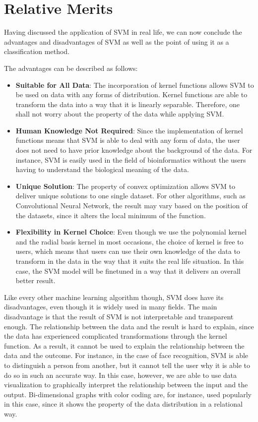 \section{Relative Merits}
Having discussed the application of SVM in real life, we can now conclude
the advantages and disadvantages of SVM as well as the point of using it 
as a classification method. 

The advantages can be described as follows:
\begin{itemize}
    \item \textbf{Suitable for All Data}: The incorporation of kernel functions
    allows SVM to be used on data with any forms of distribution. Kernel functions
    are able to transform the data into a way that it is linearly separable. Therefore,
    one shall not worry about the property of the data while applying SVM.
    \item \textbf{Human Knowledge Not Required}: Since the implementation of kernel functions
    means that SVM is able to deal with any form of data, the user does not need to 
    have prior knowledge about the background of the data. For instance, SVM is easily
    used in the field of bioinformatics without the users having to understand the 
    biological meaning of the data.
    \item \textbf{Unique Solution}: The property of convex optimization allows SVM
    to deliver unique solutions to one single dataset. For other algorithms, 
    such as Convolutional Neural Network, the result may vary based on the position of
    the datasets, since it alters the local minimum of the function.
    \item \textbf{Flexibility in Kernel Choice}: Even though we use the polynomial
    kernel and the radial basis kernel in most occasions, the choice of kernel is
    free to users, which means that users can use their own knowledge of the data
    to transform in the data in the way that it suits the real life situation. In this
    case, the SVM model will be finetuned in a way that it delivers an overall better
    result.
\end{itemize}

Like every other machine learning algorithm though,
SVM does have its disadvantages, even though it is widely used in many
fields. The main disadvantage is that the result of SVM is not 
interpretable and transparent enough. The relationship between the data
and the result is hard to explain, since the data has experienced 
complicated transformations through the kernel function.
As a result, it cannot be used to explain
the relationship between the data and the outcome. For instance,
in the case of face recognition, SVM is able to distinguish
a person from another, but it cannot tell the user why it is
able to do so in such an accurate way. In this case, however, 
we are able to use data visualization to graphically interpret the relationship
between the input and the output. Bi-dimensional graphs with color coding are, 
for instance, used popularly in this case, since it shows the property of
the data distribution in a relational way. 
\cite{procon}
